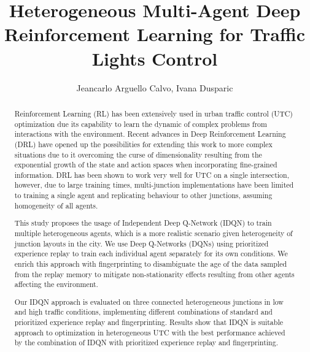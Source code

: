 \documentclass{llncs}
\title{Heterogeneous Multi-Agent Deep Reinforcement Learning for Traffic Lights Control}
\author{Jeancarlo Arguello Calvo, Ivana Dusparic}
\institute{School of Computer Science and Statistics, University of Dublin, Trinity College \\
\email{arguellj@tcd.ie, ivana.dusparic@scss.tcd.ie} }
\begin{document}
\maketitle

\begin{abstract}

Reinforcement Learning (RL) has been extensively used in urban traffic control (UTC) optimization due its capability to learn the dynamic of complex problems from interactions with the environment. Recent advances in Deep Reinforcement Learning (DRL) have opened up the possibilities for extending this work to more complex situations due to it overcoming the curse of dimensionality resulting from the exponential growth of the state and action spaces when incorporating fine-grained information. DRL has been shown to work very well for UTC on a single intersection, however, due to large training times, multi-junction implementations have been limited to training a single agent and replicating behaviour to other junctions, assuming homogeneity of all agents. 

This study proposes the usage of Independent Deep Q-Network (IDQN) to train multiple heterogeneous agents, which is a more realistic scenario given heterogeneity of junction layouts in the city. We use Deep Q-Networks (DQNs) using prioritized experience replay to train each individual agent separately for its own conditions. We enrich this approach with fingerprinting to disambiguate the age of the data sampled from the replay memory to mitigate non-stationarity effects resulting from other agents affecting the environment. 

Our IDQN approach is evaluated on three connected heterogeneous junctions in low and high traffic conditions, implementing different combinations of standard and prioritized experience replay and fingerprinting. Results show that IDQN is suitable approach to optimization in heterogeneous UTC with the best performance achieved by the combination of IDQN with prioritized experience replay and fingerprinting.  


\end{abstract}
\end{document}

